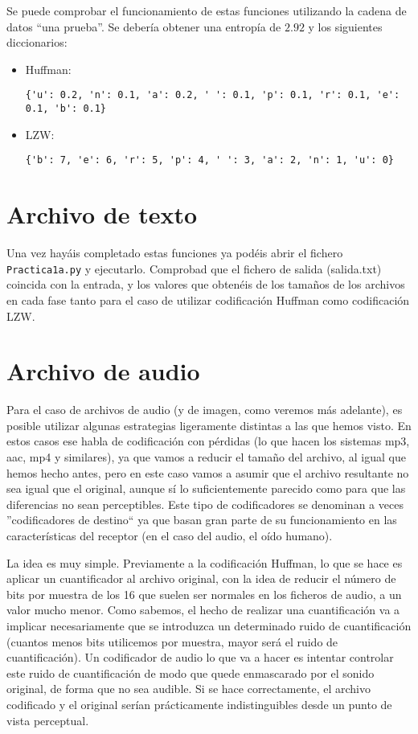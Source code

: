 \documentclass[es,practica]{uah}
\begin{document}
Se puede comprobar el funcionamiento de estas funciones utilizando la cadena de datos ``una prueba''. Se debería obtener una entropía de $2.92$ y los siguientes diccionarios:
\begin{itemize}
	\item Huffman: \begin{verbatim}{'u': 0.2, 'n': 0.1, 'a': 0.2, ' ': 0.1, 'p': 0.1, 'r': 0.1, 'e': 0.1, 'b': 0.1}\end{verbatim}
	\item LZW: \begin{verbatim}{'b': 7, 'e': 6, 'r': 5, 'p': 4, ' ': 3, 'a': 2, 'n': 1, 'u': 0}\end{verbatim}
\end{itemize}


\section{Archivo de texto}
Una vez hayáis completado estas funciones ya podéis abrir el fichero \texttt{Practica1a.py} y ejecutarlo. Comprobad que el fichero de salida (salida.txt) coincida con la entrada, y los valores que obtenéis de los tamaños de los archivos en cada fase tanto para el caso de utilizar codificación Huffman como codificación LZW.


\section{Archivo de audio}
Para el caso de archivos de audio (y de imagen, como veremos más adelante), es posible utilizar algunas estrategias ligeramente distintas a las que hemos visto. En estos casos ese habla de codificación con pérdidas (lo que hacen los sistemas mp3, aac, mp4 y similares), ya que vamos a reducir el tamaño del archivo, al igual que hemos hecho antes, pero en este caso vamos a asumir que el archivo resultante no sea igual que el original, aunque sí lo suficientemente parecido como para que las diferencias no sean perceptibles. Este tipo de codificadores se denominan a veces ''codificadores de destino`` ya que basan gran parte de su funcionamiento en las características del receptor (en el caso del audio, el oído humano).

La idea es muy simple. Previamente a la codificación Huffman, lo que se hace es aplicar un cuantificador al archivo original, con la idea de reducir el número de bits por muestra de los 16 que suelen ser normales en los ficheros de audio, a un valor mucho menor. Como sabemos, el hecho de realizar una cuantificación va a implicar necesariamente que se introduzca un determinado ruido de cuantificación (cuantos menos bits utilicemos por muestra, mayor será el ruido de cuantificación). Un codificador de audio lo que va a hacer es intentar controlar este ruido de cuantificación de modo que quede enmascarado por el sonido original, de forma que no sea audible. Si se hace correctamente, el archivo codificado y el original serían prácticamente indistinguibles desde un punto de vista perceptual. 
\end{document}

